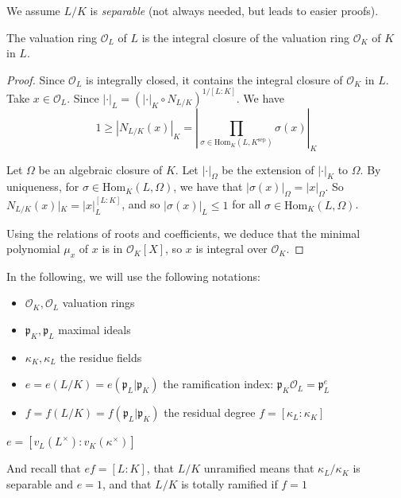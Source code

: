 We assume \(L / K\) is \emph{separable} (not always needed, but leads to easier
proofs).

\begin{lemma}{}
    The valuation ring \(\mathcal{O}_L\) of \(L\) is the integral closure of the
    valuation ring \(\mathcal{O}_K\) of \(K\) in \(L\).
\end{lemma}

\begin{proof}{}
    Since \(\mathcal{O}_L\) is integrally closed, it contains the integral
    closure of \(\mathcal{O}_K\) in \(L\). Take \(x \in \mathcal{O}_L\). Since
    \(|\cdot |_L = {\left( |\cdot |_K \circ N_{L / K} \right)}^{1 / [L : K]} \).
    We have
    \[1 \ge  |N_{L / K} {(x)}|_K = \left| \prod_{\sigma \in \mathrm{Hom}_{K}
    {(L, K^{\text{sep}})}} \sigma{(x)} \right|_K \] 

    Let \(\Omega\) be an algebraic closure of \(K\). Let \(|\cdot |_\Omega\) be
    the extension of \(|\cdot |_K\) to \(\Omega\). By uniqueness, for \(\sigma
    \in \mathrm{Hom}_K{(L, \Omega)}\), we have that \(|\sigma{(x)}|_\Omega =
    |x|_{\Omega} \). So \(N_{L/K}{(x)}|_K = |x|_L^{[L : K]} \), and so
    \(|\sigma{(x)}|_L \le 1\) for all \(\sigma \in \mathrm{Hom}_K {(L,
    \Omega)}\).

    Using the relations of roots and coefficients, we deduce that the minimal
    polynomial \(\mu_x\) of \(x\) is in \(\mathcal{O}_K[X]\), so \(x\) is
    integral over \(\mathcal{O}_K\).
\end{proof}

In the following, we will use the following notations:
\begin{itemize}[label = --]
    \item \(\mathcal{O}_K, \mathcal{O}_L\) valuation rings
    \item \(\mathfrak{p}_K, \mathfrak{p}_L\) maximal ideals
    \item \(\kappa_K, \kappa_L\) the residue fields
    \item \(e = e{(L/K)} = e {(\mathfrak{p}_L | \mathfrak{p}_K)}\) the
        ramification index: \(\mathfrak{p}_K \mathcal{O}_L = \mathfrak{p}_L^{e}\) 
    \item \(f = f{(L / K)} = f{(\mathfrak{p}_L | \mathfrak{p}_K)}\) the residual
        degree \(f = [\kappa_L : \kappa_K]\) 
\end{itemize}
\begin{remark}{}
    \(e = \left[ v_L{(L^{\times })} : v_K{(\kappa^{\times })} \right] \) 
\end{remark}
And recall that \(ef = [L : K]\), that \(L / K\) unramified means that
\(\kappa_L / \kappa_K\) is separable and \(e=1\), and that \(L / K\) is totally
ramified if \(f=1\) 

